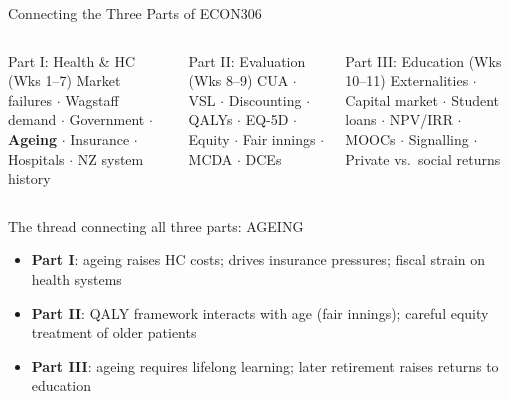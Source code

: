\documentclass[aspectratio=169, 12pt]{beamer}
\begin{document}
\begin{frame}{Connecting the Three Parts of ECON306}
  \begin{columns}
      \begin{block}{Part I: Health \& HC (Wks 1--7)}
        \footnotesize Market failures $\cdot$ Wagstaff demand $\cdot$ Government $\cdot$ \textbf{Ageing} $\cdot$ Insurance $\cdot$ Hospitals $\cdot$ NZ system history
      \end{block}
      \begin{alertblock}{Part II: Evaluation (Wks 8--9)}
        \footnotesize CUA $\cdot$ VSL $\cdot$ Discounting $\cdot$ QALYs $\cdot$ EQ-5D $\cdot$ Equity $\cdot$ Fair innings $\cdot$ MCDA $\cdot$ DCEs
      \end{alertblock}
      \begin{block}{Part III: Education (Wks 10--11)}
        \footnotesize Externalities $\cdot$ Capital market $\cdot$ Student loans $\cdot$ NPV/IRR $\cdot$ MOOCs $\cdot$ Signalling $\cdot$ Private vs.\ social returns
      \end{block}
  \end{columns}
  \vspace{0.3em}
  \begin{exampleblock}{The thread connecting all three parts: AGEING}
    \footnotesize
    \begin{itemize}
      \item \textbf{Part I}: ageing raises HC costs; drives insurance pressures; fiscal strain on health systems
      \item \textbf{Part II}: QALY framework interacts with age (fair innings); careful equity treatment of older patients
      \item \textbf{Part III}: ageing requires lifelong learning; later retirement raises returns to education
    \end{itemize}
  \end{exampleblock}
\end{frame}
\end{document}
